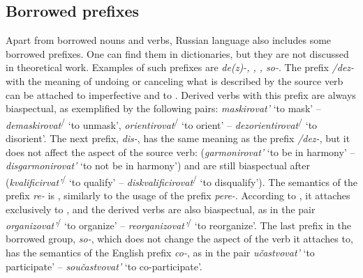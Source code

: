 \subsection{Borrowed prefixes}\label{subsection:perf:prefixes}
%
%
%
Apart from borrowed nouns and verbs, Russian language also includes some borrowed prefixes.  One can find them in dictionaries, but they are not discussed in theoretical work. Examples of such prefixes are \textit{de(z)-, , , so-}. The prefix \textit{/dez-} with the meaning of undoing or canceling what is described by the source verb can be attached to imperfective and to . Derived verbs with this prefix are always biaspectual, as exemplified by the following pairs: \textit{maskirovat'}\textsuperscript{\IPF} `to mask' -- \textit{demaskirovat}\textsuperscript{\IPF\slash\PF} `to unmask', \textit{orientirovat}\textsuperscript{\IPF\slash\PF} `to orient' -- \textit{dezorientirovat}\textsuperscript{\IPF\slash\PF} `to disorient'. The next prefix, \textit{dis-}, has the same meaning as the prefix \textit{/dez-}, but it does not affect the aspect of the source verb:   (\textit{garmonirovat'}\textsuperscript{\IPF} `to be in harmony' -- \textit{disgarmonirovat'}\textsuperscript{\IPF} `to not be in harmony') and  are still biaspectual after  (\textit{kvalificirvat'}\textsuperscript{\IPF\slash\PF} `to qualify' -- \textit{diskvalificirovat}\textsuperscript{\IPF\slash\PF} `to disqualify'). The semantics of the prefix \textit{re-} is , similarly to the  usage of the prefix \textit{pere-}. According to \citet[369]{Shvedova:82}, it attaches exclusively to , and the derived verbs are also biaspectual, as in the pair \textit{organizovat'}\textsuperscript{\IPF\slash\PF}  `to organize' -- \textit{reorganizovat'}\textsuperscript{\IPF\slash\PF}  `to reorganize'. The last prefix in the borrowed group, \textit{so-}, which does not change the aspect of the verb it attaches to, has the semantics of the English prefix \textit{co-}, as in the pair  \textit{u\v{c}astvovat'}\textsuperscript{\IPF}  `to participate' -- \textit{sou\v{c}astvovat'}\textsuperscript{\IPF}  `to co-participate'.

